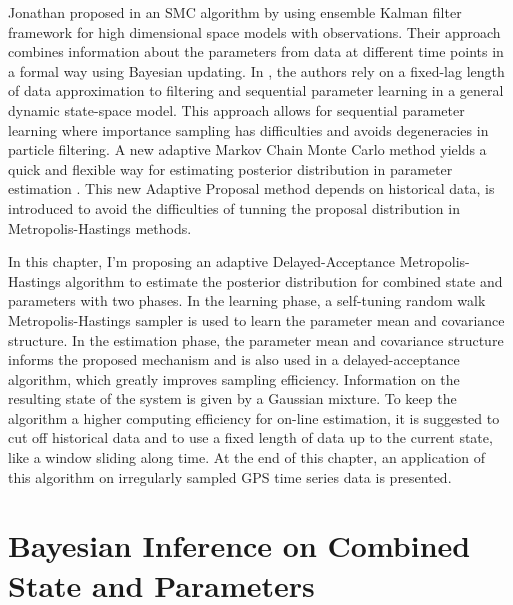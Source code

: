 Jonathan proposed in \cite{stroud2016bayesian} an SMC algorithm by using ensemble Kalman filter framework for high dimensional space models with observations. Their approach combines information about the parameters from data at different time points in a formal way using Bayesian updating. In \cite{polson2008practical}, the authors rely on a fixed-lag length of data approximation to filtering and sequential parameter learning in a general dynamic state-space model. This approach allows for sequential parameter learning where importance sampling has difficulties and avoids degeneracies in particle filtering. A new adaptive Markov Chain Monte Carlo method yields a quick and flexible way for estimating posterior distribution in parameter estimation \cite{haario1999adaptive}. This new Adaptive Proposal method depends on historical data, is introduced to avoid the difficulties of tunning the proposal distribution in Metropolis-Hastings methods. 



In this chapter, I'm proposing an adaptive Delayed-Acceptance Metropolis-Hastings algorithm to estimate the posterior distribution for combined state and parameters with two phases. In the learning phase, a self-tuning random walk Metropolis-Hastings sampler is used to learn the parameter mean and covariance structure. In the estimation phase, the parameter mean and covariance structure informs the proposed mechanism and is also used in a delayed-acceptance algorithm, which greatly improves sampling efficiency. Information on the resulting state of the system is given by a Gaussian mixture. To keep the algorithm a higher computing efficiency for on-line estimation, it is suggested to cut off historical data and to use a fixed length of data up to the current state, like a window sliding along time. At the end of this chapter, an application of this algorithm on irregularly sampled GPS time series data is presented. 

%



\section{Bayesian Inference on Combined State and Parameters}

